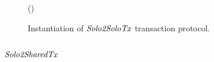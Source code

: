 \begin{figure}
\begin{center}
{\begin{varwidth}{\textwidth}
{              \< \< \\
            \procVerfProof{\varProofBob}  \< \< \\
            \varSigFin \opFunResult \procFinSig{\varSigAlice}{\varSigBob} \< \< \\
            \varExcess \opAssign {} \opAddPoint {} \< \< \\
            \pcreturn \varTx \opAssign \varTx \opUnion (\varExcess \opSeperate \varSigFin)
            }
        \end{varwidth}
        }
    \end{center}
    \caption{Instantiation of $\mathit{Solo2SoloTx}$ transaction protocol. \label{fig:solo2solotx}}
\end{figure}

\subsection{$\mathit{Solo2SharedTx}$}

